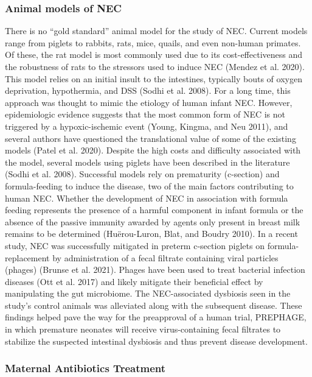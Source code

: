 \documentclass[
]{article}
\begin{document}
\hypertarget{animal-models-of-nec}{%
\subsubsection{Animal models of NEC}\label{animal-models-of-nec}}

There is no ``gold standard'' animal model for the study of NEC. Current models range from piglets to rabbits, rats, mice, quails, and even non-human primates. Of these, the rat model is most commonly used due to its cost-effectiveness and the robustness of rats to the stressors used to induce NEC (Mendez et al. 2020). This model relies on an initial insult to the intestines, typically bouts of oxygen deprivation, hypothermia, and DSS (Sodhi et al. 2008). For a long time, this approach was thought to mimic the etiology of human infant NEC. However, epidemiologic evidence suggests that the most common form of NEC is not triggered by a hypoxic-ischemic event (Young, Kingma, and Neu 2011), and several authors have questioned the translational value of some of the existing models (Patel et al. 2020). Despite the high costs and difficulty associated with the model, several models using piglets have been described in the literature (Sodhi et al. 2008). Successful models rely on prematurity (c-section) and formula-feeding to induce the disease, two of the main factors contributing to human NEC. Whether the development of NEC in association with formula feeding represents the presence of a harmful component in infant formula or the absence of the passive immunity awarded by agents only present in breast milk remains to be determined (Huërou-Luron, Blat, and Boudry 2010). In a recent study, NEC was successfully mitigated in preterm c-section piglets on formula-replacement by administration of a fecal filtrate containing viral particles (phages) (Brunse et al. 2021). Phages have been used to treat bacterial infection diseases (Ott et al. 2017) and likely mitigate their beneficial effect by manipulating the gut microbiome. The NEC-associated dysbiosis seen in the study's control animals was alleviated along with the subsequent disease. These findings helped pave the way for the preapproval of a human trial, PREPHAGE, in which premature neonates will receive virus-containing fecal filtrates to stabilize the suspected intestinal dysbiosis and thus prevent disease development.

\hypertarget{maternal-antibiotics-treatment}{%
\subsubsection{Maternal Antibiotics Treatment}\label{maternal-antibiotics-treatment}}
\end{document}
